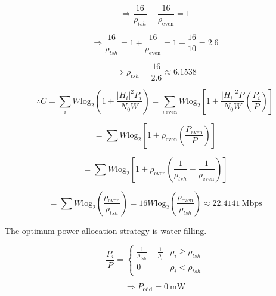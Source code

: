 \documentclass[fleqn]{article}
\begin{document}
\begin{enumerate}
		\begin{equation*}
			\Rightarrow \frac{16}{\rho_{tsh}} - \frac{16}{\rho_{\text{even}}} = 1
		\end{equation*}
		
		\begin{equation*}
			\Rightarrow \frac{16}{\rho_{tsh}} = 1 + \frac{16}{\rho_{\text{even}}} = 1 + \frac{16}{10} = 2.6
		\end{equation*}
		
		\begin{equation*}
			\Rightarrow \rho_{tsh} = \frac{16}{2.6} \approx 6.1538
		\end{equation*}
		
		\begin{equation*}
			\therefore C = \sum_i{W\text{log}_2\left(1 + \frac{|H_i|^2P_i}{N_0W}\right)} = \sum_{i\ \text{even}}{W\text{log}_2\left[1 + \frac{|H_i|^2P}{N_0W}\left(\frac{P_i}{P}\right)\right]}
		\end{equation*}
		
		\begin{equation*}
			= \sum{W\text{log}_2\left[1 + \rho_{\text{even}}\left(\frac{P_\text{even}}{P}\right)\right]}
		\end{equation*}
		
		\begin{equation*}
			 = \sum{W\text{log}_2\left[1 + \rho_{\text{even}}\left(\frac{1}{\rho_{tsh}} - \frac{1}{\rho_{\text{even}}}\right)\right]}
		\end{equation*}
		
		\begin{equation*}
			 = \sum{W\text{log}_2\left(\frac{\rho_{\text{even}}}{\rho_{tsh}}\right)} = 16W\text{log}_2\left(\frac{\rho_{\text{even}}}{\rho_{tsh}}\right) \approx 22.4141\ \text{Mbps}
		\end{equation*}
		
		The optimum power allocation strategy is water filling.
		
		\begin{equation*}
			\frac{P_i}{P} = \begin{cases}
				\frac{1}{\rho_{tsh}} - \frac{1}{\rho_i} & \rho_i \geq \rho_{tsh} \\
				0 & \rho_i < \rho_{tsh}
			\end{cases}
		\end{equation*}
		
		\begin{equation*}
			\Rightarrow P_{\text{odd}} = 0\ \text{mW}
		\end{equation*}
		

\end{enumerate}
\end{document}
